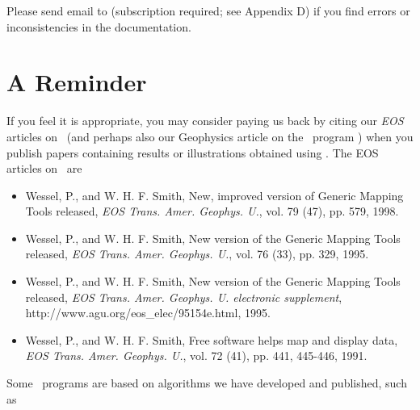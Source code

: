 Please send email to
(subscription required; see Appendix D) if you find errors or inconsistencies in the documentation.

\chapter*{A Reminder}

If you feel it is appropriate, you may consider paying us back by
citing our \emph{EOS} articles on \GMT\ (and perhaps also our Geophysics
article on the \GMT\ program ) when you publish papers
containing results or illustrations obtained using \GMT.  The EOS
articles on \GMT\ are
%
%

\begin{itemize}

\item{Wessel, P., and W. H. F. Smith, New, improved version of Generic
Mapping Tools released, \emph{EOS Trans. Amer. Geophys. U.}, vol. 79
(47), pp. 579, 1998.}

\item{Wessel, P., and W. H. F. Smith, New version of the Generic
Mapping Tools released, \emph{EOS Trans. Amer. Geophys. U.}, vol. 76
(33), pp. 329, 1995.}

\item{Wessel, P., and W. H. F. Smith, New version of the Generic
Mapping Tools released, \emph{EOS Trans. Amer. Geophys. U. electronic
supplement}, 
{http://www.agu.org/eos\_elec/95154e.html}, 1995.}

\item{Wessel, P., and W. H. F. Smith, Free software helps map and
display data, \emph{EOS Trans. Amer. Geophys. U.}, vol. 72 (41),
pp. 441, 445-446, 1991.}

\end{itemize}
\noindent
Some \GMT\ programs are based on algorithms we have developed and
published, such as

